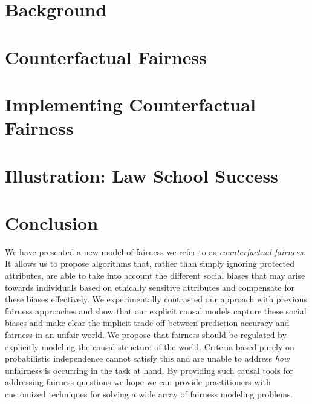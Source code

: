 \documentclass{article}
\begin{document}
\section{Background}
\label{sec:background}


%

%

\section{Counterfactual Fairness}
\label{sec:count_fair}


\section{Implementing Counterfactual Fairness}
\label{sec:methods}


\section{Illustration: Law School Success}
\label{sec:experiments}


\section{Conclusion}
\label{sec:conclusion}
We have presented a new model of fairness we refer to as {\em
  counterfactual fairness}. It allows us to propose algorithms
that, rather than simply ignoring protected attributes, are able to
take into account the different social biases that may arise towards
individuals based on ethically sensitive attributes
and compensate
for these biases effectively. We experimentally contrasted our
approach with previous fairness approaches and show that our explicit
causal models capture these social biases and make clear the implicit
trade-off between prediction accuracy and fairness in an unfair
world. We propose that fairness should be regulated by explicitly
modeling the causal structure of the world. Criteria based purely on
probabilistic independence cannot satisfy this and are unable to
address \emph{how} unfairness is occurring in the task at hand. By
providing such causal tools for addressing fairness questions we hope
we can provide practitioners with customized techniques for solving a
wide array of fairness modeling problems.
\end{document}
